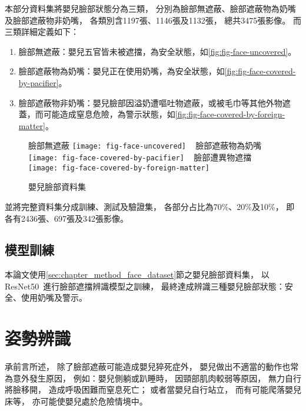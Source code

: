\documentclass[class=NCU_thesis, crop=false]{standalone}
\begin{document}
本部分資料集將嬰兒臉部狀態分為三類，
分別為臉部無遮蔽、臉部遮蔽物為奶嘴及臉部遮蔽物非奶嘴，
各類別含1197張、1146張及1132張，
總共3475張影像。
而三類詳細定義如下：
\begin{enumerate}
    \item 臉部無遮蔽：嬰兒五官皆未被遮擋，為安全狀態，如\cref{fig:fig-face-uncovered}。
    \item 臉部遮蔽物為奶嘴：嬰兒正在使用奶嘴，為安全狀態，如\cref{fig:fig-face-covered-by-pacifier}。
    \item 臉部遮蔽物非奶嘴：嬰兒臉部因溢奶遭嘔吐物遮蔽，或被毛巾等其他外物遮蓋，而可能造成窒息危險，為警示狀態，如\cref{fig:fig-face-covered-by-foreign-matter}。
\end{enumerate}
\begin{figure}[!hbt]
    \centering
    \subcaptionbox
        {臉部無遮蔽
        \label{fig:fig-face-uncovered}}
        {\texttt{[image: fig-face-uncovered]}}
    ~
    \subcaptionbox
        {臉部遮蔽物為奶嘴
        \label{fig:fig-face-covered-by-pacifier}}
        {\texttt{[image: fig-face-covered-by-pacifier]}}
    ~
    \subcaptionbox
        {臉部遭異物遮擋
        \label{fig:fig-face-covered-by-foreign-matter}}
        {\texttt{[image: fig-face-covered-by-foreign-matter]}}
    \caption{嬰兒臉部資料集}
    \label{fig:fig-face-dataset}
\end{figure}

並將完整資料集分成訓練、測試及驗證集，
各部分占比為70\%、20\%及10\%，
即各有2436張、697張及342張影像。

\subsection{模型訓練}
本論文使用\ref{sec:chapter_method_face_dataset}節之嬰兒臉部資料集，
以ResNet50~\cite{he_deep_2016}進行臉部遮擋辨識模型之訓練，
最終達成辨識三種嬰兒臉部狀態：安全、使用奶嘴及警示。

\section{姿勢辨識}
\label{sec:chapter_method_posture}
承前言所述，
除了臉部遮蔽可能造成嬰兒猝死症外，
嬰兒做出不適當的動作也常為意外發生原因，
例如：嬰兒側躺或趴睡時，
因頸部肌肉較弱等原因，
無力自行將臉移開，
造成呼吸困難而窒息死亡；
或者當嬰兒自行站立，
而有可能爬落嬰兒床等，
亦可能使嬰兒處於危險情境中。
\end{document}
